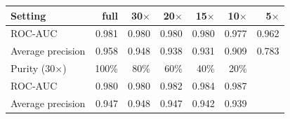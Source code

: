 \begin{tabular}{lrrrrrr}
\toprule
Setting & full & 30$\times$ & 20$\times$ & 15$\times$ & 10$\times$ & 5$\times$ \\
\midrule
ROC-AUC & 0.981 & 0.980 & 0.980 & 0.980 & 0.977 & 0.962 \\
Average precision & 0.958 & 0.948 & 0.938 & 0.931 & 0.909 & 0.783 \\
\midrule
Purity (30$\times$) & 100\% & 80\% & 60\% & 40\% & 20\% &  \\
\midrule
ROC-AUC & 0.980 & 0.980 & 0.982 & 0.984 & 0.987 &  \\
Average precision & 0.947 & 0.948 & 0.947 & 0.942 & 0.939 &  \\
\bottomrule
\end{tabular}
